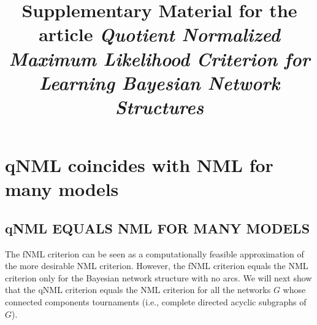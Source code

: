 \documentclass[12pt]{article}
\date{}
\title{Supplementary Material for the article \textit{Quotient Normalized Maximum Likelihood Criterion for Learning Bayesian Network Structures} }
\begin{document}
\maketitle

\appendix
\section{qNML coincides with NML for many models}


\subsection{qNML EQUALS NML FOR MANY MODELS}
The fNML criterion can be seen as a computationally feasible
approximation of the more desirable NML criterion.  However, the fNML
criterion equals the NML criterion only for the Bayesian network
structure with no arcs.  We will next show that the qNML criterion
equals the NML criterion for all the networks $G$ whose connected
components tournaments (i.e., complete directed acyclic subgraphs of
$G$).
\end{document}
